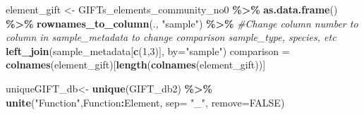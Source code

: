 \documentclass[
]{book}
\newenvironment{Shaded}{\begin{snugshade}}{\end{snugshade}}
\newcommand{\AttributeTok}[1]{\textcolor[rgb]{0.13,0.29,0.53}{#1}}
\newcommand{\CommentTok}[1]{\textcolor[rgb]{0.56,0.35,0.01}{\textit{#1}}}
\newcommand{\ConstantTok}[1]{\textcolor[rgb]{0.56,0.35,0.01}{#1}}
\newcommand{\DecValTok}[1]{\textcolor[rgb]{0.00,0.00,0.81}{#1}}
\newcommand{\FunctionTok}[1]{\textcolor[rgb]{0.13,0.29,0.53}{\textbf{#1}}}
\newcommand{\NormalTok}[1]{#1}
\newcommand{\OtherTok}[1]{\textcolor[rgb]{0.56,0.35,0.01}{#1}}
\newcommand{\SpecialCharTok}[1]{\textcolor[rgb]{0.81,0.36,0.00}{\textbf{#1}}}
\newcommand{\StringTok}[1]{\textcolor[rgb]{0.31,0.60,0.02}{#1}}
\begin{document}
\begin{Shaded}
\begin{Highlighting}[]
\NormalTok{element\_gift }\OtherTok{\textless{}{-}}\NormalTok{ GIFTs\_elements\_community\_no0 }\SpecialCharTok{\%\textgreater{}\%} 
  \FunctionTok{as.data.frame}\NormalTok{() }\SpecialCharTok{\%\textgreater{}\%} 
  \FunctionTok{rownames\_to\_column}\NormalTok{(., }\StringTok{"sample"}\NormalTok{) }\SpecialCharTok{\%\textgreater{}\%} 
  \CommentTok{\#Change column number to column in sample\_metadata to change comparison sample\_type, species, etc}
  \FunctionTok{left\_join}\NormalTok{(sample\_metadata[}\FunctionTok{c}\NormalTok{(}\DecValTok{1}\NormalTok{,}\DecValTok{3}\NormalTok{)], }\AttributeTok{by=}\StringTok{"sample"}\NormalTok{)}
\NormalTok{comparison }\OtherTok{=} \FunctionTok{colnames}\NormalTok{(element\_gift)[}\FunctionTok{length}\NormalTok{(}\FunctionTok{colnames}\NormalTok{(element\_gift))]}

\NormalTok{uniqueGIFT\_db}\OtherTok{\textless{}{-}} \FunctionTok{unique}\NormalTok{(GIFT\_db2) }\SpecialCharTok{\%\textgreater{}\%} \FunctionTok{unite}\NormalTok{(}\StringTok{"Function"}\NormalTok{,Function}\SpecialCharTok{:}\NormalTok{Element, }\AttributeTok{sep=} \StringTok{"\_"}\NormalTok{, }\AttributeTok{remove=}\ConstantTok{FALSE}\NormalTok{)}


\end{Highlighting}
\end{Shaded}
\end{document}
